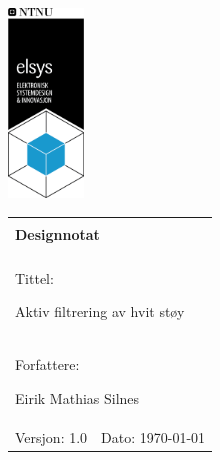 \begin{minipage}[c]{0.15\textwidth}
\includegraphics[width=2.0cm]{Bilder/elsys_pos_staaende_ntnu.png}  
\end{minipage}
\begin{minipage}[c]{0.85\textwidth}

\renewcommand{\arraystretch}{1.7}
\large 
\begin{tabularx}{\textwidth}{|X|X|}
\hline
\multicolumn{2}{|l|}{} \\
\multicolumn{2}{|l|}{\huge \textbf{Designnotat}} \\
\multicolumn{2}{|l|}{}  \\
\hline
\multicolumn{2}{|l|}{Tittel: 

Aktiv filtrering av hvit støy
} \\ 
\hline
\multicolumn{2}{|l|}{Forfattere: 

Eirik Mathias Silnes
} \\
\hline

Versjon: 1.0 & Dato: \today
\\
\hline 
\end{tabularx}
\end{minipage}
\normalsize
